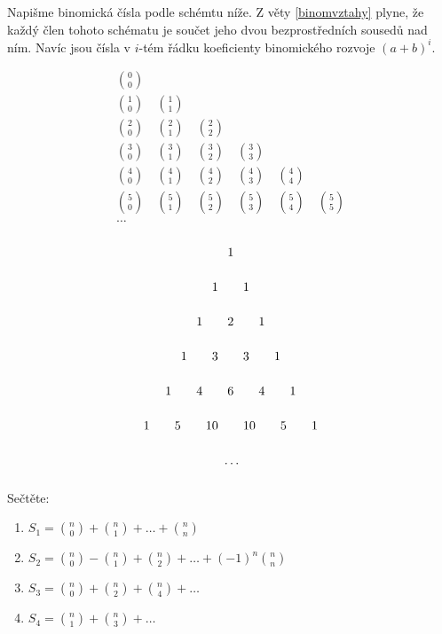 \begin{pozn}
    Napišme binomická čísla podle schémtu níže. Z věty \ref{binomvztahy} plyne,
    že každý člen tohoto schématu je součet jeho dvou bezprostředních sousedů nad ním.
    Navíc jsou čísla v $i$-tém řádku koeficienty binomického rozvoje $(a+b)^i.$

    \begin{minipage}{0.48\textwidth}
        \begin{gather*}
            \binom{0}{0} \\
            \binom{1}{0} \quad \binom{1}{1} \\
            \binom{2}{0} \quad \binom{2}{1} \quad \binom{2}{2} \\
            \binom{3}{0} \quad \binom{3}{1} \quad \binom{3}{2} \quad \binom{3}{3} \\
            \binom{4}{0} \quad \binom{4}{1} \quad \binom{4}{2} \quad \binom{4}{3} \quad \binom{4}{4} \\
            \binom{5}{0} \quad \binom{5}{1} \quad \binom{5}{2} \quad \binom{5}{3} \quad \binom{5}{4} \quad \binom{5}{5} \\
            \dots
        \end{gather*}
    \end{minipage}
    \hfill
    \begin{minipage}{0.48\textwidth}
    \begin{gather*}
        1\vphantom{\binom{a}{a}} \\
        1\vphantom{\binom{a}{a}} \quad\quad 1 \\
        1\vphantom{\binom{a}{a}} \quad\quad 2 \quad\quad 1 \\
        1\vphantom{\binom{a}{a}} \quad\quad 3 \quad\quad 3 \quad\quad 1 \\
        1\vphantom{\binom{a}{a}} \quad\quad 4 \quad\quad 6 \quad\quad 4 \quad\quad 1 \\
        1\vphantom{\binom{a}{a}} \quad\quad 5 \quad\quad 10 \quad\quad 10 \quad\quad 5 \quad\quad 1 \\
        \vphantom{\binom{a}{a}}\dots
    \end{gather*}
    \end{minipage}


\end{pozn}

\begin{priklad}
Sečtěte:
\begin{enumerate}[$i.$]
\item $S_1 = \binom{n}{0}+\binom{n}{1}+\dots+\binom{n}{n}$
\item $S_2= \binom{n}{0}-\binom{n}{1}+\binom{n}{2}+\dots+(-1)^n\binom{n}{n}$
\item $S_3= \binom{n}{0}+\binom{n}{2}+\binom{n}{4}+\dots$
\item $S_4= \binom{n}{1}+\binom{n}{3}+\dots$
\end{enumerate}
\end{priklad}

